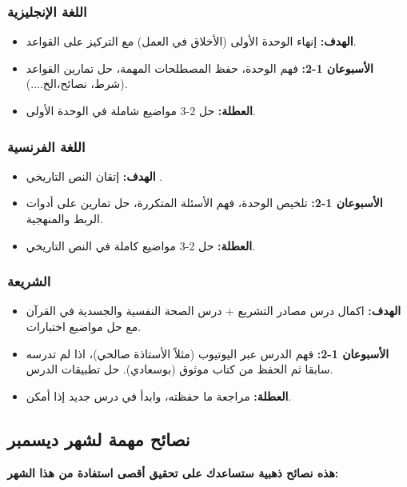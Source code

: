 \documentclass[12pt,a4paper]{book}
\newcommand{\importantAr}[1]{%
	\begin{important}
		\bfseries #1
	\end{important}
}
\begin{document}
\subsubsection*{اللغة الإنجليزية}
\begin{itemize}
	\item \textbf{الهدف:} إنهاء الوحدة الأولى (الأخلاق في العمل) مع التركيز على القواعد.
	\item \textbf{الأسبوعان 1-2:} فهم الوحدة، حفظ المصطلحات المهمة، حل تمارين القواعد (شرط، نصائح،الخ....).
	\item \textbf{العطلة:} حل 2-3 مواضيع شاملة في الوحدة الأولى.
\end{itemize}

\subsubsection*{اللغة الفرنسية}
\begin{itemize}
	\item \textbf{الهدف:} إتقان النص التاريخي .
	\item \textbf{الأسبوعان 1-2:} تلخيص الوحدة، فهم الأسئلة المتكررة، حل تمارين على أدوات الربط والمنهجية.
	\item \textbf{العطلة:} حل 2-3 مواضيع كاملة في النص التاريخي.
\end{itemize}

\subsubsection*{الشريعة}
\begin{itemize}
	\item \textbf{الهدف:} اكمال درس مصادر التشريع + درس الصحة النفسية والجسدية في القرآن مع حل مواضيع اختبارات.
	\item \textbf{الأسبوعان 1-2:} فهم الدرس عبر اليوتيوب (مثلاً الأستاذة صالحي)، اذا لم تدرسه سابقا ثم الحفظ من كتاب موثوق (بوسعادي). حل تطبيقات الدرس.
	\item \textbf{العطلة:} مراجعة ما حفظته، وابدأ في درس جديد إذا أمكن.
\end{itemize}

\subsection{نصائح مهمة لشهر ديسمبر}
\label{sec:random-tips4}

\importantAr{هذه نصائح ذهبية ستساعدك على تحقيق أقصى استفادة من هذا الشهر:}
\end{document}
